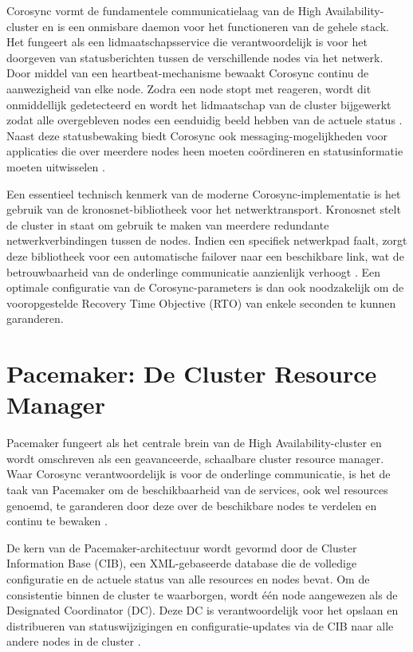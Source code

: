 Corosync vormt de fundamentele communicatielaag van de High Availability-cluster en is een onmisbare daemon voor het functioneren van de gehele stack. Het fungeert als een lidmaatschapsservice die verantwoordelijk is voor het doorgeven van statusberichten tussen de verschillende nodes via het netwerk. Door middel van een heartbeat-mechanisme bewaakt Corosync continu de aanwezigheid van elke node. Zodra een node stopt met reageren, wordt dit onmiddellijk gedetecteerd en wordt het lidmaatschap van de cluster bijgewerkt zodat alle overgebleven nodes een eenduidig beeld hebben van de actuele status \autocite{Cubepath2026, Oracle}. Naast deze statusbewaking biedt Corosync ook messaging-mogelijkheden voor applicaties die over meerdere nodes heen moeten coördineren en statusinformatie moeten uitwisselen \autocite{RedHat}. 
\medskip

Een essentieel technisch kenmerk van de moderne Corosync-implementatie is het gebruik van de kronosnet-bibliotheek voor het netwerktransport. Kronosnet stelt de cluster in staat om gebruik te maken van meerdere redundante netwerkverbindingen tussen de nodes. Indien een specifiek netwerkpad faalt, zorgt deze bibliotheek voor een automatische failover naar een beschikbare link, wat de betrouwbaarheid van de onderlinge communicatie aanzienlijk verhoogt \autocite{RedHat}. Een optimale configuratie van de Corosync-parameters is dan ook noodzakelijk om de vooropgestelde Recovery Time Objective (RTO) van enkele seconden te kunnen garanderen.

\section{Pacemaker: De Cluster Resource Manager}
Pacemaker fungeert als het centrale brein van de High Availability-cluster en wordt omschreven als een geavanceerde, schaalbare cluster resource manager. Waar Corosync verantwoordelijk is voor de onderlinge communicatie, is het de taak van Pacemaker om de beschikbaarheid van de services, ook wel resources genoemd, te garanderen door deze over de beschikbare nodes te verdelen en continu te bewaken \autocite{ClusterLabs}.
\medskip

De kern van de Pacemaker-architectuur wordt gevormd door de Cluster Information Base (CIB), een XML-gebaseerde database die de volledige configuratie en de actuele status van alle resources en nodes bevat. Om de consistentie binnen de cluster te waarborgen, wordt één node aangewezen als de Designated Coordinator (DC). Deze DC is verantwoordelijk voor het opslaan en distribueren van statuswijzigingen en configuratie-updates via de CIB naar alle andere nodes in de cluster \autocite{ClusterLabs, RedHat}.
\medskip

